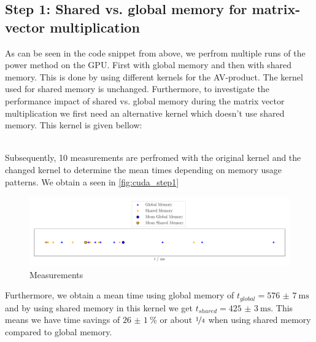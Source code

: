 \subsection{Step 1: Shared vs. global memory for matrix-vector multiplication}
As can be seen in the code snippet from above, we perfrom multiple runs of the power method on the GPU. First with global memory and then with shared memory. This is done by using different kernels for the AV-product. The kernel used for shared memory is unchanged.
Furthermore, to investigate the performance impact of shared vs. global memory during the matrix vector multiplication we first need an alternative kernel which doesn't use shared memory. This kernel is given bellow: 

\\
Subsequently, 10 measurements are perfromed with the original kernel and the changed kernel to determine the mean times depending on memory usage patterns. 
We obtain a  seen in \autoref{fig:cuda_step1}
\begin{figure}[H]
    \centering
    \includegraphics[width=\textwidth]{../fig/lab3/step1.png}
    \caption{Measurements }
    \label{fig:cuda_step1}
\end{figure}
Furthermore, we obtain a mean time using global memory of $t_{global} = \SI{576(7)}{\milli\second}$ and by using shared memory in this kernel we get $t_{shared} = \SI{425(3)}{\milli\second}$. 
This means we have time savings of $\SI{26(1)}{\percent}$ or about $\nicefrac{1}{4}$ when using shared memory compared to global memory. 
